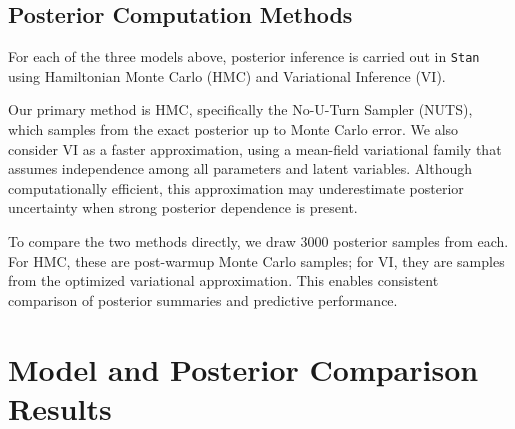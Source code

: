 \documentclass[12pt,letterpaper,fleqn]{article}
\begin{document}
\subsection{Posterior Computation Methods}

For each of the three models above, posterior inference is carried out in \texttt{Stan} using Hamiltonian Monte Carlo (HMC) and Variational Inference (VI).



Our primary method is HMC, specifically the No-U-Turn Sampler (NUTS), which samples from the exact posterior up to Monte Carlo error. We also consider VI as a faster approximation, using a mean-field variational family that assumes independence among all parameters and latent variables. Although computationally efficient, this approximation may underestimate posterior uncertainty when strong posterior dependence is present.

To compare the two methods directly, we draw 3000 posterior samples from each. For HMC, these are post-warmup Monte Carlo samples; for VI, they are samples from the optimized variational approximation. This enables consistent comparison of posterior summaries and predictive performance.



\section{Model and Posterior Comparison Results}
\end{document}
